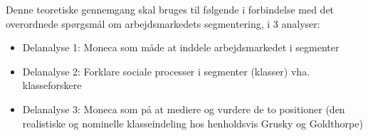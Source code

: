 






Denne teoretiske gennemgang skal bruges til følgende i forbindelse med det overordnede spørgsmål om arbejdsmarkedets segmentering, i 3 analyser:

\begin{itemize}
  \item Delanalyse 1: Moneca som måde at inddele arbejdsmarkedet i segmenter
  \item Delanalyse 2: Forklare sociale processer i segmenter (klasser) vha. klasseforskere
  \item Delanalyse 3: Moneca som på at mediere og vurdere de to positioner (den realistiske og nominelle klasseindeling hos henholdsvis Grusky og Goldthorpe)
\end{itemize}



